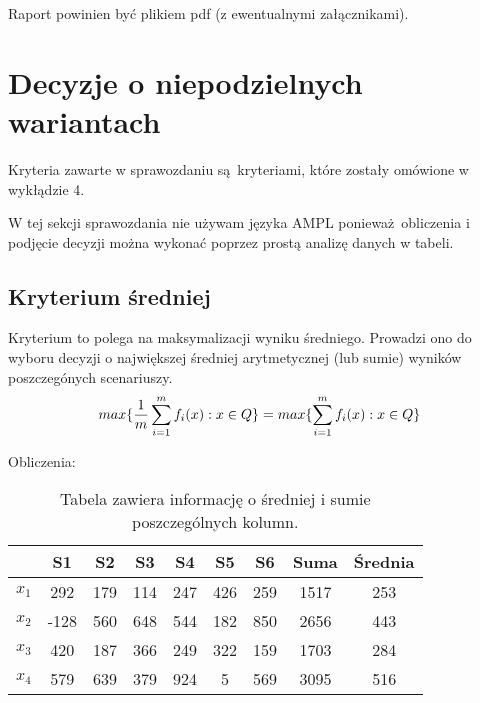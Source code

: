\documentclass{article}
\begin{document}
Raport powinien być plikiem pdf (z ewentualnymi załącznikami).

\newpage

\section{Decyzje o niepodzielnych wariantach}

Kryteria zawarte w sprawozdaniu są kryteriami, które zostały omówione w wykłądzie 4.

W tej sekcji sprawozdania nie używam języka AMPL ponieważ obliczenia i podjęcie decyzji można wykonać poprzez
prostą analizę danych w tabeli.

\subsection{Kryterium średniej}


Kryterium to polega na maksymalizacji wyniku średniego. Prowadzi ono do wyboru decyzji o największej średniej arytmetycznej (lub sumie) 
wyników poszczegónych scenariuszy. \\

\begin{equation}
    \centering
    max\{\frac{1}{m} \sum^{m}_{i=1} f_{i}(x) : x \in Q\} = max \{ \sum^{m}_{i=1} f_{i}(x) : x \in Q \}
\end{equation}

Obliczenia:

\begin{table}[H]
  \begin{center}
    \begin{tabular}{ c |  c  c   c   c   c   c  | c | c  }
      & S1 & S2 & S3 & S4 & S5 & S6 & Suma & Średnia \\
      \hline
      $x_1$ & 292 & 179 & 114 & 247 & 426 & 259 & 1517 & 253 \\
      $x_2$ & -128 & 560 & 648 & 544 & 182 & 850 & 2656 & 443 \\
      $x_3$ & 420 & 187 & 366 & 249 & 322 & 159 & 1703 & 284 \\
      $x_4$ & 579 & 639 & 379 & 924 & 5 & 569 & \cellcolor{orange!25} 3095 & \cellcolor{orange!25} 516 \\
      \hline
    \end{tabular} 
    \caption{\label{table:avg}Tabela zawiera informację o średniej i sumie poszczególnych kolumn.}
  \end{center}
\end{table}
\end{document}

